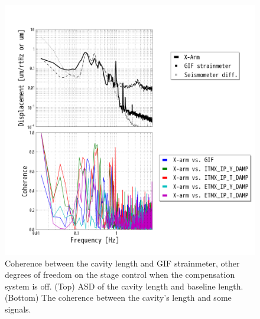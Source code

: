 \begin{figure}[p]
    \centering 
    \includegraphics[width=15cm]{./img_chap6/img615.png}
    \caption{Coherence between the cavity length and GIF strainmeter, other degrees of freedom on the stage control when the compensation system is off. (Top) ASD of the cavity length and baseline length. (Bottom) The coherence between the cavity's length and some signals.}\label{img:img615}
\end{figure}





